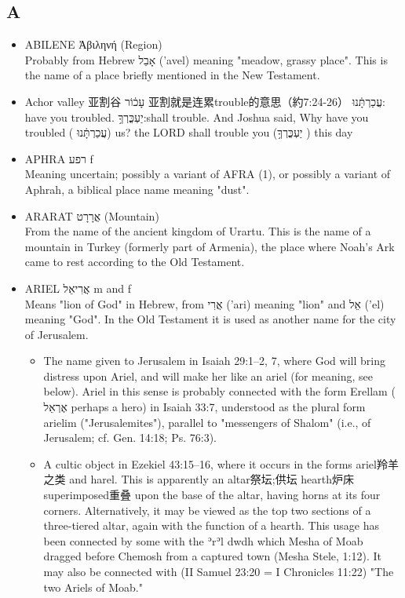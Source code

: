 \subsection{A}
\begin{itemize} 
\itemsep-.25em 
\item ABILENE Ἀβιληνή (Region) \\
Probably from Hebrew אָבֵל ('avel) meaning "meadow, grassy place". This is the name of a place briefly mentioned in the New Testament.
\item Achor valley 亚割谷  עָכ֔וֹר  亚割就是连累trouble的意思（約7:24-26）  עֲכַרְתָּ֔נוּ: have you troubled. יַעְכֳּרְךָ֥:shall trouble. And Joshua said, Why have you troubled ( עֲכַרְתָּ֔נוּ) us? the LORD shall trouble you (יַעְכֳּרְךָ֥ ) this day\\
\item APHRA רפע f \\
Meaning uncertain; possibly a variant of AFRA (1), or possibly a variant of Aphrah, a biblical place name meaning "dust". 
\item ARARAT אֲרָרָט (Mountain) \\
From the name of the ancient kingdom of Urartu. This is the name of a mountain in Turkey (formerly part of Armenia), the place where Noah's Ark came to rest according to the Old Testament.
\item ARIEL אֲרִיאֵל m and f \\
Means "lion of God" in Hebrew, from אֲרִי ('ari) meaning "lion" and אֵל ('el) meaning "God". In the Old Testament it is used as another name for the city of Jerusalem. 
\begin{itemize} 
\itemsep-.25em 
\item The name given to Jerusalem in Isaiah 29:1–2, 7, where God will bring distress upon Ariel, and will make her like an ariel (for meaning, see below). Ariel in this sense is probably connected with the form Erellam ( אֶרְאֵל perhaps a hero) in Isaiah 33:7, understood as the plural form arielim ("Jerusalemites"), parallel to "messengers of Shalom" (i.e., of Jerusalem; cf. Gen. 14:18; Ps. 76:3).
\item A cultic object in Ezekiel 43:15–16, where it occurs in the forms ariel羚羊之类 and harel. This is apparently an altar祭坛;供坛 hearth炉床 superimposed重叠 upon the base of the altar, having horns at its four corners. Alternatively, it may be viewed as the top two sections of a three-tiered altar, again with the function of a hearth. This usage has been connected by some with the ʾrʾl dwdh which Mesha of Moab dragged before Chemosh from a captured town (Mesha Stele, 1:12). It may also be connected with (II Samuel 23:20 = I Chronicles 11:22) "The two Ariels of Moab." 

\end{itemize}
\end{itemize}
